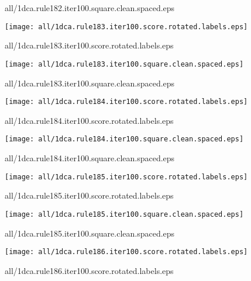 \documentclass{article}
\begin{document}
{\footnotesize all/1dca.rule182.iter100.square.clean.spaced.eps}
\begin{center}
\begin{minipage}{\textwidth}
\texttt{[image: all/1dca.rule183.iter100.score.rotated.labels.eps]}
\end{minipage}
\end{center}
{\footnotesize all/1dca.rule183.iter100.score.rotated.labels.eps}
\begin{center}
\begin{minipage}{\textwidth}
\texttt{[image: all/1dca.rule183.iter100.square.clean.spaced.eps]}
\end{minipage}
\end{center}
{\footnotesize all/1dca.rule183.iter100.square.clean.spaced.eps}
\begin{center}
\begin{minipage}{\textwidth}
\texttt{[image: all/1dca.rule184.iter100.score.rotated.labels.eps]}
\end{minipage}
\end{center}
{\footnotesize all/1dca.rule184.iter100.score.rotated.labels.eps}
\begin{center}
\begin{minipage}{\textwidth}
\texttt{[image: all/1dca.rule184.iter100.square.clean.spaced.eps]}
\end{minipage}
\end{center}
{\footnotesize all/1dca.rule184.iter100.square.clean.spaced.eps}
\begin{center}
\begin{minipage}{\textwidth}
\texttt{[image: all/1dca.rule185.iter100.score.rotated.labels.eps]}
\end{minipage}
\end{center}
{\footnotesize all/1dca.rule185.iter100.score.rotated.labels.eps}
\begin{center}
\begin{minipage}{\textwidth}
\texttt{[image: all/1dca.rule185.iter100.square.clean.spaced.eps]}
\end{minipage}
\end{center}
{\footnotesize all/1dca.rule185.iter100.square.clean.spaced.eps}
\begin{center}
\begin{minipage}{\textwidth}
\texttt{[image: all/1dca.rule186.iter100.score.rotated.labels.eps]}
\end{minipage}
\end{center}
{\footnotesize all/1dca.rule186.iter100.score.rotated.labels.eps}
\end{document}
